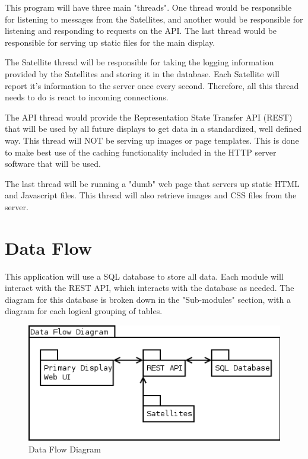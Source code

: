 This program will have three main "threads".
One thread would be responsible for listening to messages from the Satellites, and another would be responsible for listening and responding to requests on the API.
The last thread would be responsible for serving up static files for the main display.

The Satellite thread will be responsible for taking the logging information provided by the Satellites and storing it in the database.
Each Satellite will report it's information to the server once every second.
Therefore, all this thread needs to do is react to incoming connections.

The API thread would provide the Representation State Transfer API (REST) that will be used by all future displays to get data in a standardized, well defined way.
This thread will NOT be serving up images or page templates.
This is done to make best use of the caching functionality included in the HTTP server software that will be used.

The last thread will be running a "dumb" web page that servers up static HTML and Javascript files.
This thread will also retrieve images and CSS files from the server.

\section{Data Flow}

This application will use a SQL database to store all data.
Each module will interact with the REST API, which interacts with the database as needed.
The diagram for this database is broken down in the "Sub-modules" section, with a diagram for each logical grouping of tables.

\begin{figure}[H]
\centering
\includegraphics[scale=0.75]{Software/images/DataFlowDiagram.png}
\caption{Data Flow Diagram}
\label{img:S_DataFlowDiagram}
\end{figure}

